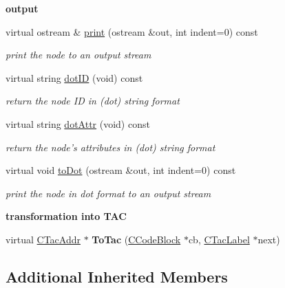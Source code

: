 \begin{Indent}{\bf output}\par
\begin{DoxyCompactItemize}
\item 
virtual ostream \& \hyperlink{classCAstStatCall_a81de938cb27cff3d7b29d6b61ba3607e}{print} (ostream \&out, int indent=0) const 
\begin{DoxyCompactList}\small\item\em print the node to an output stream \end{DoxyCompactList}\item 
virtual string \hyperlink{classCAstStatCall_abf38c5be00c7dd3301cc57aaa01b9944}{dot\-I\-D} (void) const 
\begin{DoxyCompactList}\small\item\em return the node I\-D in (dot) string format \end{DoxyCompactList}\item 
virtual string \hyperlink{classCAstStatCall_a2a65ab592a6223d388af8ef6f16caccc}{dot\-Attr} (void) const 
\begin{DoxyCompactList}\small\item\em return the node's attributes in (dot) string format \end{DoxyCompactList}\item 
virtual void \hyperlink{classCAstStatCall_a2108865db3d7ef4f4d55dca53a45473e}{to\-Dot} (ostream \&out, int indent=0) const 
\begin{DoxyCompactList}\small\item\em print the node in dot format to an output stream \end{DoxyCompactList}\end{DoxyCompactItemize}
\end{Indent}
\begin{Indent}{\bf transformation into T\-A\-C}\par
\begin{DoxyCompactItemize}
\item 
\hypertarget{classCAstStatCall_a47b6db8af6362d2c149253d180435c0d}{virtual \hyperlink{classCTacAddr}{C\-Tac\-Addr} $\ast$ {\bfseries To\-Tac} (\hyperlink{classCCodeBlock}{C\-Code\-Block} $\ast$cb, \hyperlink{classCTacLabel}{C\-Tac\-Label} $\ast$next)}\label{classCAstStatCall_a47b6db8af6362d2c149253d180435c0d}

\end{DoxyCompactItemize}
\end{Indent}
\subsection*{Additional Inherited Members}


